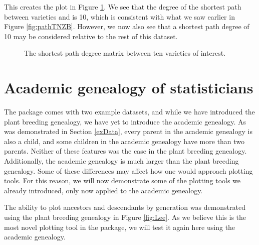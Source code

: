 \documentclass[article,shortnames]{jss}
\begin{document}
This creates the plot in Figure \ref{fig:degMatrix}. We see that the degree of the shortest path between varieties  and  is 10, which is consistent with what we saw earlier in Figure \ref{fig:pathTNZB}. However, we now also see that a shortest path degree of 10 may be considered relative to the rest of this dataset.

\begin{figure}[h]
    \centering
    \caption{The shortest path degree matrix between ten varieties of interest.}
    \label{fig:degMatrix}
\end{figure}

\section{Academic genealogy of statisticians}

The  package comes with two example datasets, and while we have introduced the plant breeding genealogy, we have yet to introduce the academic genealogy. As was demonstrated in Section \ref{exData}, every parent in the academic genealogy is also a child, and some children in the academic genealogy have more than two parents. Neither of these features was the case in the plant breeding genealogy. Additionally, the academic genealogy is much larger than the plant breeding genealogy. Some of these differences may affect how one would approach  plotting tools. For this reason, we will now demonstrate some of the  plotting tools we already introduced, only now applied to the academic genealogy. 

The ability to plot ancestors and descendants by generation was demonstrated using the plant breeding genealogy in Figure \ref{fig:Lee}. As we believe this is the most novel plotting tool in the  package, we will test it again here using the academic genealogy.
\end{document}
